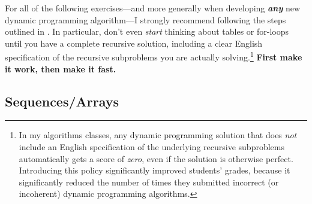 For all of the following exercises---and more generally when developing \textbf{\textit{any}} new dynamic programming algorithm---I strongly recommend following the steps outlined in .
In particular, don’t even \textit{start} thinking about tables or for-loops until you have a complete recursive solution, including a clear English specification of the recursive subproblems you are actually solving.\footnote{In my algorithms classes, any dynamic programming solution that does \textit{not} include an English specification of the underlying recursive subproblems automatically gets a score of \textit{zero}, even if the solution is otherwise perfect. Introducing this policy significantly improved students’ grades, because it significantly reduced the number of times they submitted incorrect (or incoherent) dynamic programming algorithms.}
\textbf{First make it work, then make it fast.}

\subsection*{Sequences/Arrays}

